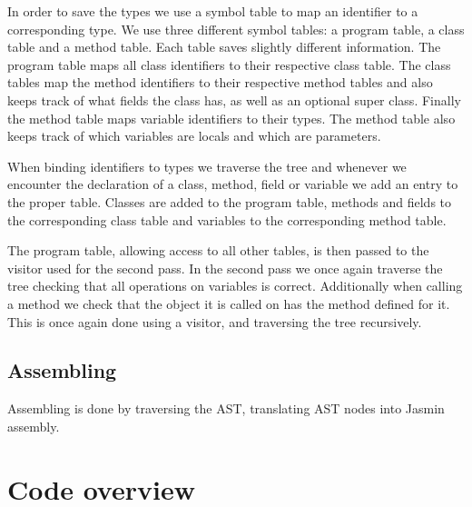 \documentclass[a4paper]{article}
\begin{document}
In order to save the types we use a symbol table to map an identifier to a
corresponding type. We use three different symbol tables: a program table, a
class table and a method table. Each table saves slightly different information.
The program table maps all class identifiers to their respective class table.
The class tables map the method identifiers to their respective method tables
and also keeps track of what fields the class has, as well as an optional super
class. Finally the method table maps variable identifiers to their types. The
method table also keeps track of which variables are locals and which are
parameters.

When binding identifiers to types we traverse the tree and whenever we encounter
the declaration of a class, method, field or variable we add an entry to the
proper table. Classes are added to the program table, methods and fields to the
corresponding class table and variables to the corresponding method table.

The program table, allowing access to all other tables, is then passed to the
visitor used for the second pass. In the second pass we once again traverse the
tree checking that all operations on variables is correct. Additionally when
calling a method we check that the object it is called on has the method defined
for it. This is once again done using a visitor, and traversing the tree
recursively.

\subsection{Assembling}

Assembling is done by traversing the AST, translating AST nodes into Jasmin
assembly.

\section{Code overview}
\end{document}
